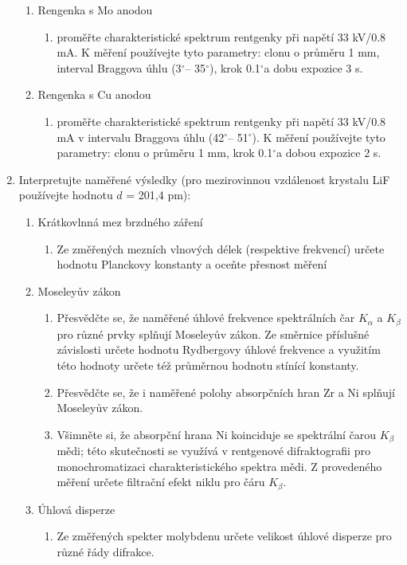 \documentclass[a4paper,12pt]{article}
\newcommand{\st}{$^{\circ}$}
\begin{document}
\begin{enumerate}
\begin{enumerate}
            \item Rengenka s Mo anodou
                \begin{enumerate}
                    \item proměřte charakteristické spektrum rentgenky při napětí 33 kV/0.8 mA. K měření používejte tyto parametry: clonu o průměru 1  mm, interval Braggova úhlu (3\st – 35\st), krok 0.1\st a dobu expozice 3 s. 
                \end{enumerate}
            \item Rengenka s Cu anodou
                \begin{enumerate}
                    \item proměřte charakteristické spektrum rentgenky při napětí 33 kV/0.8 mA v intervalu Braggova úhlu (42\st – 51\st). K měření používejte tyto parametry: clonu o průměru 1 mm, krok 0.1\st a dobou expozice 2 s.
                \end{enumerate}
        \end{enumerate}
    \item Interpretujte naměřené výsledky (pro mezirovinnou vzdálenost krystalu LiF používejte hodnotu $d$ = 201,4 pm):
        \begin{enumerate}
            \item Krátkovlnná mez brzdného záření
                \begin{enumerate}
                    \item Ze změřených mezních vlnových délek (respektive frekvencí) určete hodnotu Planckovy konstanty a oceňte přesnost měření
                \end{enumerate}
            \item Moseleyův zákon
                \begin{enumerate}
                    \item Přesvědčte se, že naměřené úhlové frekvence spektrálních čar $K_\alpha$ a $K_\beta$ pro různé prvky splňují Moseleyův zákon. Ze směrnice příslušné závislosti určete hodnotu Rydbergovy úhlové frekvence a využitím této hodnoty určete též průměrnou hodnotu stínící konstanty.
                    \item Přesvědčte se, že i naměřené polohy absorpčních hran Zr a Ni splňují Moseleyův zákon.
                    \item Všimněte si, že absorpční hrana Ni koinciduje se spektrální čarou $K_\beta$ mědi; této skutečnosti se využívá v rentgenové difraktografii pro monochromatizaci charakteristického spektra mědi. Z provedeného měření určete filtrační efekt niklu pro čáru $K_\beta$. 
                \end{enumerate}
            \item Úhlová disperze
                \begin{enumerate}
                    \item Ze změřených spekter molybdenu určete velikost úhlové disperze pro různé řády difrakce. 
                \end{enumerate}
        \end{enumerate}
\end{enumerate}
\end{document}
